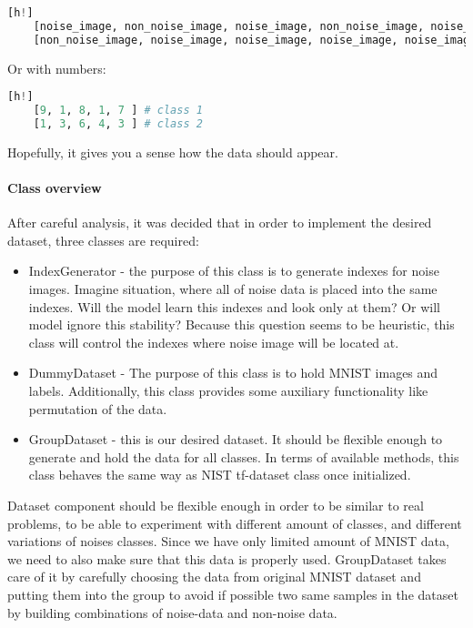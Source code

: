 \begin{lstlisting}[language=Python][h!]
	[noise_image, non_noise_image, noise_image, non_noise_image, noise_image ] # class 1
	[non_noise_image, noise_image, noise_image, noise_image, noise_image ] # class 2
\end{lstlisting}

Or with numbers:
\begin{lstlisting}[language=Python][h!]
	[9, 1, 8, 1, 7 ] # class 1
	[1, 3, 6, 4, 3 ] # class 2
\end{lstlisting}

Hopefully, it gives you a sense how the data should appear.

\paragraph{Class overview}

After careful analysis, it was decided that in order to implement
the desired dataset, three classes are required:
\begin{itemize}
	\item IndexGenerator - the purpose of this class is to generate indexes for
		noise images. Imagine situation, where all of noise data is placed into
		the same indexes. Will the model learn this indexes and look only at
		them? Or will model ignore this stability? Because this question seems
		to be heuristic, this class will control the indexes where noise image
		will be located at.
	\item DummyDataset - The purpose of this class is to hold MNIST images
		and labels. Additionally, this class provides some auxiliary functionality
		like permutation of the data.
	\item GroupDataset - this is our desired dataset. It should be flexible
		enough to generate and hold the data for all classes. In terms of
		available methods, this class behaves the same way as NIST tf-dataset class
		once initialized.
\end{itemize}

Dataset component should be flexible enough in order to be similar to real problems,
to be able to experiment with different amount of classes, and
different variations of noises classes. Since we have only limited amount of MNIST data,
we need to also make sure that this data is properly used. GroupDataset takes
care of it by carefully choosing the data from original MNIST dataset and putting
them into the group to avoid if possible two same samples in the dataset by building
combinations of noise-data and non-noise data.

